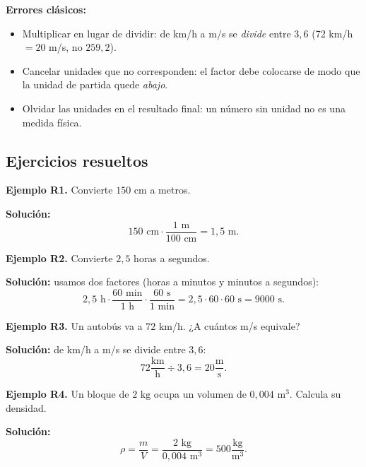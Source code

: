 \documentclass[12pt, letterpaper]{article}
\begin{document}
\begin{cuadroadvertencia}
  \textbf{Errores clásicos:}
  \begin{itemize}[leftmargin=*]
    \item Multiplicar en lugar de dividir: de km/h a m/s se \emph{divide} entre $3{,}6$ (72 km/h $= 20$ m/s, no $259{,}2$).
    \item Cancelar unidades que no corresponden: el factor debe colocarse de modo que la unidad de partida quede \emph{abajo}.
    \item Olvidar las unidades en el resultado final: un número sin unidad no es una medida física.
  \end{itemize}
\end{cuadroadvertencia}

\subsection{Ejercicios resueltos}

\textbf{Ejemplo R1.} Convierte $150 \text{ cm}$ a metros.

\begin{cuadrosolucion}
  \textbf{Solución:}
  $$150 \text{ cm} \cdot \frac{1 \text{ m}}{100 \text{ cm}} = 1{,}5 \text{ m}.$$
\end{cuadrosolucion}

\textbf{Ejemplo R2.} Convierte $2{,}5$ horas a segundos.

\begin{cuadrosolucion}
  \textbf{Solución:} usamos dos factores (horas a minutos y minutos a segundos):
  $$2{,}5 \text{ h} \cdot \frac{60 \text{ min}}{1 \text{ h}} \cdot \frac{60 \text{ s}}{1 \text{ min}} = 2{,}5 \cdot 60 \cdot 60 \text{ s} = 9000 \text{ s}.$$
\end{cuadrosolucion}

\textbf{Ejemplo R3.} Un autobús va a $72$ km/h. ¿A cuántos m/s equivale?

\begin{cuadrosolucion}
  \textbf{Solución:} de km/h a m/s se divide entre $3{,}6$:
  $$72 \frac{\text{km}}{\text{h}} \div 3{,}6 = 20 \frac{\text{m}}{\text{s}}.$$
\end{cuadrosolucion}

\textbf{Ejemplo R4.} Un bloque de $2 \text{ kg}$ ocupa un volumen de $0{,}004 \text{ m}^3$. Calcula su densidad.

\begin{cuadrosolucion}
  \textbf{Solución:}
  $$\rho = \frac{m}{V} = \frac{2 \text{ kg}}{0{,}004 \text{ m}^3} = 500 \frac{\text{kg}}{\text{m}^3}.$$
\end{cuadrosolucion}
\end{document}
